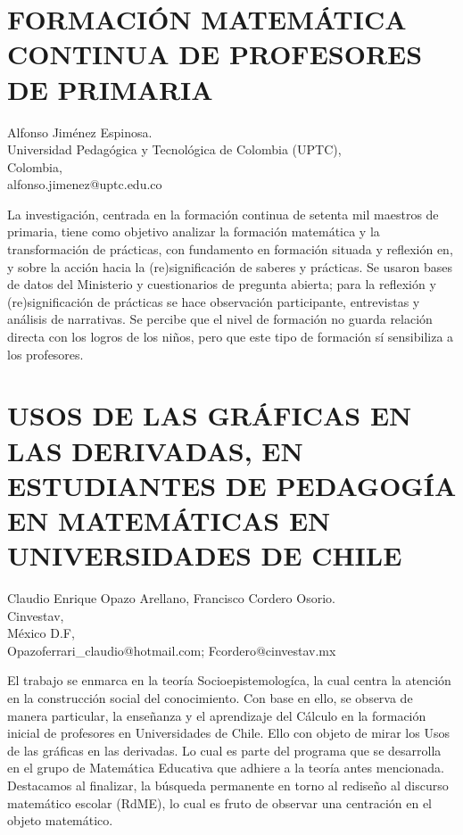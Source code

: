 \section{FORMACIÓN MATEMÁTICA CONTINUA DE PROFESORES DE PRIMARIA}

\begin{datos}
Alfonso Jiménez Espinosa.\\
Universidad Pedagógica y Tecnológica de Colombia (UPTC),\\
\hfill Colombia, \\
\hfill alfonso.jimenez@uptc.edu.co
\end{datos}

La investigación, centrada en la formación continua de setenta mil
maestros de primaria, tiene como objetivo analizar la formación matemática
y la transformación de prácticas, con fundamento en formación situada
y reflexión en, y sobre la acción hacia la (re)significación de saberes
y prácticas. Se usaron bases de datos del Ministerio y cuestionarios
de pregunta abierta; para la reflexión y (re)significación de prácticas
se hace observación participante, entrevistas y análisis de narrativas.
Se percibe que el nivel de formación no guarda relación directa con
los logros de los niños, pero que este tipo de formación sí sensibiliza
a los profesores.


\section{\uppercase{ Usos de las gráficas en las derivadas, en estudiantes
de pedagogía en matemáticas en universidades de Chile}}

\begin{datos}
Claudio Enrique Opazo Arellano, Francisco Cordero Osorio.\\
Cinvestav,\\
\hfill México D.F, \\
\hfill Opazoferrari\_{}claudio@hotmail.com; Fcordero@cinvestav.mx
\end{datos}

El trabajo se enmarca en la teoría Socioepistemologíca, la cual centra
la atención en la construcción social del conocimiento. Con base en
ello, se observa de manera particular, la enseñanza y el aprendizaje
del Cálculo en la formación inicial de profesores en Universidades
de Chile. Ello con objeto de mirar los Usos de las gráficas en las
derivadas. Lo cual es parte del programa que se desarrolla en el grupo
de Matemática Educativa que adhiere a la teoría antes mencionada.
Destacamos al finalizar, la búsqueda permanente en torno al rediseño
al discurso matemático escolar (RdME), lo cual es fruto de observar
una centración en el objeto matemático. 


